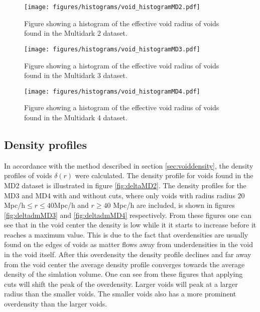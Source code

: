 \begin{figure}[htbp]
    \texttt{[image: figures/histograms/void\_histogramMD2.pdf]}
    \caption{Figure showing a histogram of the effective void radius of voids found in the Multidark 2 dataset.}
    \label{fig:voidhistMD2}
\end{figure}
\begin{figure}[htbp]
    \texttt{[image: figures/histograms/void\_histogramMD3.pdf]}
    \caption{Figure showing a histogram of the effective void radius of voids found in the Multidark 3 dataset.}
    \label{fig:voidhistMD3}
\end{figure}
\begin{figure}[htbp]
    \texttt{[image: figures/histograms/void\_histogramMD4.pdf]}
    \caption{Figure showing a histogram of the effective void radius of voids found in the Multidark 4 dataset.}
    \label{fig:voidhistMD4}
\end{figure}
\subsection{Density profiles}
In accordance with the method described in section \ref{sec:voiddensity}, the density profiles of voids $\delta(r)$ were calculated. The density profile for voids found in the MD2 dataset is illustrated in figure \ref{fig:deltaMD2}. The density profiles for the MD3 and MD4 with and without cuts, where only voids with radius radius $20$Mpc/h$\leq r\leq 40$Mpc/h and $r\geq 40$ Mpc/h are included, is shown in figures \ref{fig:deltadmMD3} and \ref{fig:deltadmMD4} respectively. From these figures one can see that in the void center the density is low while it it starts to increase before it reaches a maximum value. This is due to the fact that overdensities are usually found on the edges of voids as matter flows away from underdensities in the void in the void itself. After this overdensity the density profile declines and far away from the void center the average density profile converges towards the average density of the simlation volume. One can see from these figures that applying cuts will shift the peak of the overdensity. Larger voids will peak at a larger radius than the smaller voids. The smaller voids also has a more prominent overdensity than the larger voids.\\\indent
 
